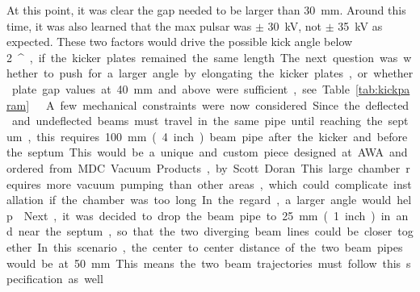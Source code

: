 At this point, it was clear the gap needed to be larger than \SI{30}{mm}. 
Around this time, it was also learned that the max pulsar was $\pm$ \SI{30}{kV}, not $\pm$ \SI{35}{kV} as expected. 
These two factors would drive the possible kick angle below \SI{2}{^\circ}, if the kicker plates remained the same length.
The next question was whether to push for a larger angle by elongating the kicker plates, 
or whether plate gap values at \SI{40}{mm} and above were sufficient, see Table \ref{tab:kickparam}.
 
A few mechanical constraints were now considered. 
Since the deflected and undeflected beams must travel in the same pipe until reaching the septum, 
this requires \SI{100}{mm} (\SI{4}{inch}) beam pipe after the kicker and before the septum.
This would be a unique and custom piece designed at AWA and ordered from MDC Vacuum Products, by Scott Doran. 
This large chamber requires more vacuum pumping than other areas, 
which could complicate installation if the chamber was too long. 
In the regard, a larger angle would help.


Next, it was decided to drop the beam pipe to \SI{25}{mm} (\SI{1}{inch}) in and near the septum, 
so that the two diverging beam lines could be closer together. 
In this scenario, the center to center distance of the two beam pipes would be at \SI{50}{mm}.
This means the two beam trajectories must follow this specification as well.


